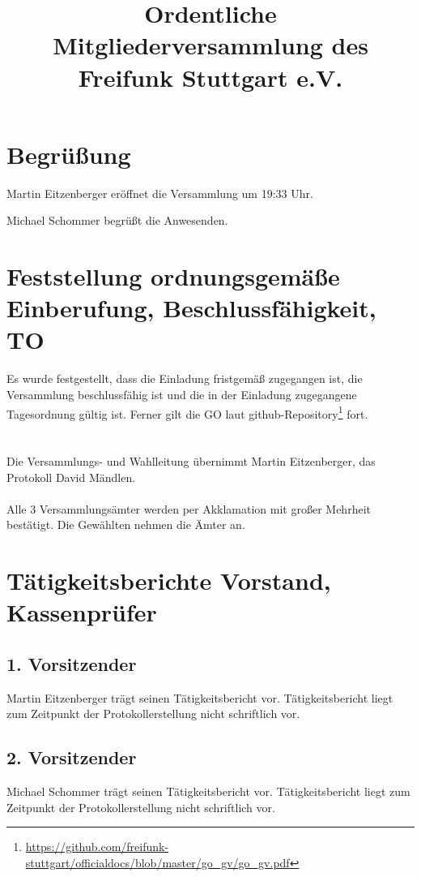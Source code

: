 \documentclass[a4paper]{scrartcl}
\title{Ordentliche Mitgliederversammlung des Freifunk Stuttgart e.V.}
\begin{document}
\maketitle

\tableofcontents

\clearpage

\listoftables

\clearpage

\section{Begrüßung}
Martin Eitzenberger eröffnet die Versammlung um 19:33 Uhr.

Michael Schommer begrüßt die Anwesenden.

\section{Feststellung ordnungsgemäße Einberufung, Beschlussfähigkeit, TO}

Es wurde festgestellt, dass die Einladung fristgemäß zugegangen ist, die Versammlung beschlussfähig ist und die in der Einladung zugegangene Tagesordnung gültig ist.
Ferner gilt die GO laut github-Repository\footnote{\url{https://github.com/freifunk-stuttgart/officialdocs/blob/master/go_gv/go_gv.pdf}} fort.\\
\\
\\
Die Versammlungs- und Wahlleitung übernimmt Martin Eitzenberger, das Protokoll David Mändlen.\\
\\
Alle 3 Versammlungsämter werden per Akklamation mit großer Mehrheit bestätigt. Die Gewählten nehmen die Ämter an.

\clearpage

\section{Tätigkeitsberichte Vorstand, Kassenprüfer}
\subsection{1. Vorsitzender}
Martin Eitzenberger trägt seinen Tätigkeitsbericht vor.
Tätigkeitsbericht liegt zum Zeitpunkt der Protokollerstellung nicht schriftlich vor.

\subsection{2. Vorsitzender}
Michael Schommer trägt seinen Tätigkeitsbericht vor.
Tätigkeitsbericht liegt zum Zeitpunkt der Protokollerstellung nicht schriftlich vor.
\end{document}
